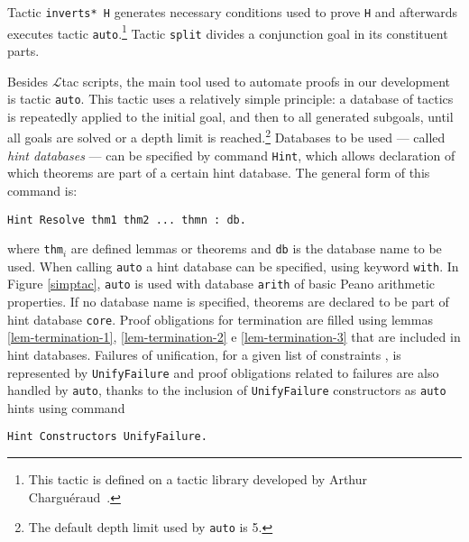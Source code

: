 Tactic \texttt{inverts* H} generates necessary conditions used to
prove \texttt{H} and afterwards executes tactic
\texttt{auto}.\footnote{This tactic is defined on a tactic library
  developed by Arthur Charguéraud~\cite{Pierce:SF}.} Tactic
\texttt{split} divides a conjunction goal in its constituent parts.

Besides $\mathcal{L}$tac scripts, the main tool used to automate
proofs in our development is tactic \texttt{auto}. This tactic uses a
relatively simple principle: a database of tactics is repeatedly
applied to the initial goal, and then to all generated subgoals, until
all goals are solved or a depth limit is reached.\footnote{The default
  depth limit used by \texttt{auto} is 5.}  Databases to be used ---
called {\em hint databases\/} --- can be specified by command
\texttt{Hint}, which allows declaration of which theorems are part of
a certain hint database. The general form of this command is:
\begin{lstlisting}
Hint Resolve thm1 thm2 ... thmn : db.
\end{lstlisting}
where \texttt{thm}$_i$ are defined lemmas or theorems and \texttt{db}
is the database name to be used. When calling \texttt{auto} a hint
database can be specified, using keyword \texttt{with}. In Figure
\ref{simptac}, \texttt{auto} is used with database \texttt{arith} of
basic Peano arithmetic properties. If no database name is specified,
theorems are declared to be part of hint database \texttt{core}. Proof
obligations for termination are filled using lemmas
\ref{lem-termination-1}, \ref{lem-termination-2} e
\ref{lem-termination-3} that are included in hint databases. Failures
of unification, for a given list of constraints \C, is represented by
\texttt{UnifyFailure} and proof obligations related to failures are
also handled by \texttt{auto}, thanks to the inclusion of
\texttt{UnifyFailure} constructors as \texttt{auto} hints using
command 
\begin{lstlisting}
Hint Constructors UnifyFailure.
\end{lstlisting}
